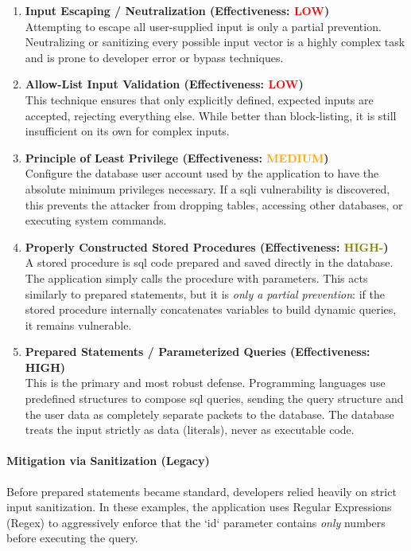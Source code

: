 \begin{enumerate}
    \item \textbf{Input Escaping / Neutralization (Effectiveness: \textcolor{red}{LOW})} \\
    Attempting to escape all user-supplied input is only a partial prevention. Neutralizing or sanitizing every possible input vector is a highly complex task and is prone to developer error or bypass techniques.
    
    \item \textbf{Allow-List Input Validation (Effectiveness: \textcolor{red}{LOW})} \\
    This technique ensures that only explicitly defined, expected inputs are accepted, rejecting everything else. While better than block-listing, it is still insufficient on its own for complex inputs.
    
    \item \textbf{Principle of Least Privilege (Effectiveness: \textcolor{orange}{MEDIUM})} \\
    Configure the database user account used by the application to have the absolute minimum privileges necessary. If a \gls{sqli} vulnerability is discovered, this prevents the attacker from dropping tables, accessing other databases, or executing system commands.
    
    \item \textbf{Properly Constructed Stored Procedures (Effectiveness: \textcolor{olive}{HIGH-})} \\
    A stored procedure is \gls{sql} code prepared and saved directly in the database. The application simply calls the procedure with parameters. This acts similarly to prepared statements, but it is \textit{only a partial prevention}: if the stored procedure internally concatenates variables to build dynamic queries, it remains vulnerable.
    
    \item \textbf{Prepared Statements / Parameterized Queries (Effectiveness: \textcolor{green!60!black}{HIGH})} \\
    This is the primary and most robust defense. Programming languages use predefined structures to compose \gls{sql} queries, sending the query structure and the user data as completely separate packets to the database. The database treats the input strictly as data (literals), never as executable code.
\end{enumerate}

\paragraph{Mitigation via Sanitization (Legacy)}
Before prepared statements became standard, developers relied heavily on strict input sanitization. In these examples, the application uses Regular Expressions (Regex) to aggressively enforce that the `id` parameter contains \textit{only} numbers before executing the query.

